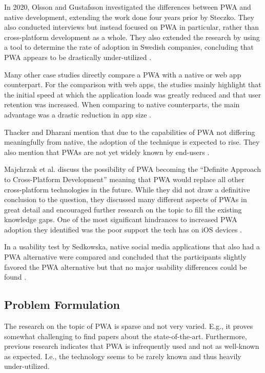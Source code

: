 \documentclass[a4paper,12pt]{article}
\begin{document}
In 2020, Olsson and Gustafsson investigated the differences between PWA and native development, extending the work done four years prior by Steczko. They also conducted interviews but instead focused on PWA in particular, rather than cross-platform development as a whole. They also extended the research by using a tool to determine the rate of adoption in Swedish companies, concluding that PWA appears to be drastically under-utilized \cite{thesis_sverige}.

Many other case studies directly compare a PWA with a native or web app counterpart. For the comparison with web apps, the studies mainly highlight that the initial speed at which the application loads was greatly reduced and that user retention was increased. When comparing to native counterparts, the main advantage was a drastic reduction in app size \cite{casestudies_mia, thesis_pwa_2017, casestudies_google_1, casestudies_google_2, realize_native_with_pwa}.

Thacker and Dharani mention that due to the capabilities of PWA not differing meaningfully from native, the adoption of the technique is expected to rise. They also mention that PWAs are not yet widely known by end-users \cite{realize_native_with_pwa}.

Majchrzak et al. discuss the possibility of PWA becoming the “Definite Approach to Cross-Platform Development” meaning that PWA would replace all other cross-platform technologies in the future. While they did not draw a definitive conclusion to the question, they discussed many different aspects of PWAs in great detail and encouraged further research on the topic to fill the existing knowledge gaps. One of the most significant hindrances to increased PWA adoption they identified was the poor support the tech has on iOS devices \cite{pwa_definite_approach}.

In a usability test by Sedkowska, native social media applications that also had a PWA alternative were compared and concluded that the participants slightly favored the PWA alternative but that no major usability differences could be found \cite{thesis_pwa_ux}.

\subsection{Problem Formulation}
\label{Intro_problem}
The research on the topic of PWA is sparse and not very varied. E.g., it proves somewhat challenging to find papers about the state-of-the-art. Furthermore, previous research indicates that PWA is infrequently used and not as well-known as expected. I.e., the technology seems to be rarely known and thus heavily under-utilized.
\end{document}
